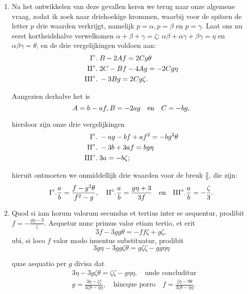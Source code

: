 \documentclass[10pt,a4paper]{article}
\newcommand{\switchenum}{\setcounter{enumi}{\arabic{enumi}-1}\switchcolumn}
\begin{document}
\begin{paracol}{2}
\begin{enumerate}[topsep=1px]
		\switchenum
		\item Na het ontwikkelen van deze gevallen keren we terug naar onze algemene vraag, zodat ik zoek naar driehoekige krommen, waarbij voor de spitsen de letter $p$ drie waarden verkrijgt, namelijk $p=\alpha, p=\beta$ en $p=\gamma$. Laat ons nu eerst kortheidshalve verwelkomen  $\alpha+\beta+\gamma = \zeta$; $\alpha\beta + \alpha \gamma + \beta \gamma = \eta$ en $\alpha \beta \gamma = \theta$, en de drie vergelijkingen voldoen aan:
		\begin{align*}
			\text{I}\degree. \;&B -2Af = 2Cg\theta\\
			\text{II}\degree. \;& 2C-Bf-4Ag = -2Cg\eta\\
			\text{III}\degree. \;& -3Bg = 2Cg\zeta.
		\end{align*}
		\par Aangezien derhalve het is
		\[
			A=b\;{\color{red}-}\;af, B=-2ag \quad\text{en}\quad C= -bg,
		\]
		\par hierdoor zijn onze drie vergelijkingen
		\begin{align*}
			\text{I}\degree. \;& -ag -bf + af^2 = -bg^2\theta\\
			\text{II}\degree. \;& -3b + 3af = bg\eta\\
			\text{III}\degree. \;& 3a = -b\zeta;		
		\end{align*}
		\par hieruit ontmoeten we onmiddellijk drie waarden voor de breuk $\frac{a}{b}$, die zijn:
		\[
			\text{I}\degree. \frac{a}{b} = \frac{f-g^2\theta}{f^2-g},\quad  \text{II}\degree. \frac{a}{b} = \frac{g\eta + 3}{3f} \quad \text{en}\quad \text{III}\degree. \frac{a}{b} = -\frac{\zeta}{3}.
		\]
		
		\switchcolumn*
		
		\item Quod si iam horum valorum secundus et tertius inter se aequentur, prodibit $f=-\frac{g\eta -3 }{\zeta}$. Aequetur nunc primus valor etiam tertio, et erit
		\[
			3f-3gg\theta = -ff \zeta + g \zeta,
		\]
		ubi, si loco $f$ valor modo inuentus substituatur, prodibit
		\[
			3g\eta -3gg\zeta \theta = g\zeta \zeta - gg\eta \eta
		\]
		\par quae aequatio per $g$ divisa dat
		\begin{align*}
			&3\eta - 3g\zeta \theta = \zeta \zeta - g\eta \eta, \quad \text{unde concluditur}\\
			&g= \frac{3\eta - \zeta \zeta}{3\zeta \theta - \eta \eta}, \quad \text{hincque porro} \quad f = \frac{\zeta \eta - 9\theta}{3\zeta \theta - \eta \eta}.
		\end{align*}
		

\end{enumerate}
\end{paracol}
\end{document}
